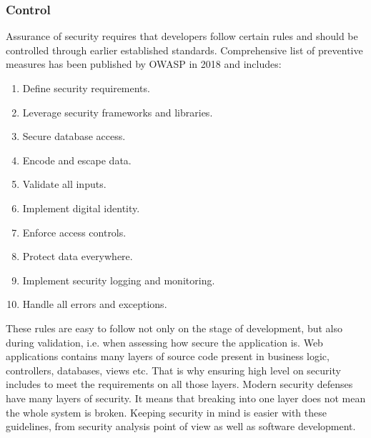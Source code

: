 \documentclass{article} %
\begin{document}
\subsubsection{Control}
Assurance of security requires that developers follow certain rules and should be controlled through earlier established standards. Comprehensive list of preventive measures has been published by OWASP in 2018 \cite{bib:owasp_controls} and includes:
\begin{enumerate}
    \item Define security requirements.
    \item Leverage security frameworks and libraries.
    \item Secure database access.
    \item Encode and escape data.
    \item Validate all inputs.
    \item Implement digital identity.
    \item Enforce access controls.
    \item Protect data everywhere.
    \item Implement security logging and monitoring.
    \item Handle all errors and exceptions.
\end{enumerate}
These rules are easy to follow not only on the stage of development, but also during validation, i.e. when assessing how secure the application is. Web applications contains many layers of source code present in business logic, controllers, databases, views etc. That is why ensuring high level on security includes to meet the requirements on all those layers. Modern security defenses have many layers of security. It means that breaking into one layer does not mean the whole system is broken. Keeping security in mind is easier with these guidelines, from security analysis point of view as well as software development.
\end{document}

